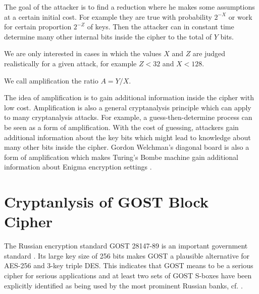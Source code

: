 \begin{mydef}
	The goal of the attacker
	is to find a reduction where he makes some assumptions
	at a certain initial cost.
	For example they are true with probability $2^{-X}$
	or work for certain proportion $2^{-Z}$ of keys.
	Then the attacker can in constant time determine
	many other internal bits inside the cipher to the total of $Y$ bits.
	
	We are only interested in cases in which the values
	$X$ and $Z$ are judged realistically for a given attack,
	for example $Z<32$ and $X<128$.
	
	We call amplification the ratio $A=Y/X$.
\end{mydef}

The idea of amplification is to gain additional information inside the cipher with low cost. Amplification is also a general cryptanalysis principle which can apply to many cryptanalysis attacks. For example, a guess-then-determine process can be seen as a form of amplification. With the cost of guessing, attackers gain additional information about the key bits which might lead to knowledge about many other bits inside the cipher. 
Gordon Welchman's diagonal board is also a form of amplification which makes Turing's Bombe machine gain additional information about Enigma encryption settings \cite{CourtoisBlockEnigmaSlides}. 




\section{Cryptanlysis of GOST Block Cipher} \label{sec:introductionToGOST}
The Russian encryption standard
GOST 28147-89 %
is an important government standard
\cite{gost198928147}.
Its large key size of 256 bits makes GOST a plausible alternative for AES-256 and 3-key triple DES.
This indicates that GOST means to be a serious cipher for serious applications
and at least two sets of GOST S-boxes have been explicitly identified as being used by the most prominent Russian banks, %
cf. \cite{schneier2007applied,GOSTRussianReferenceImplementation}.

